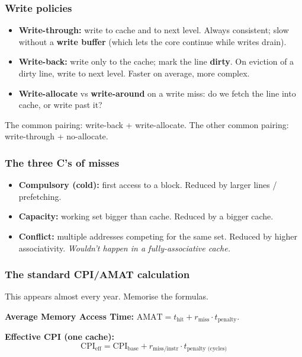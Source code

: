 \documentclass[11pt,a4paper]{article}
\begin{document}
\subsubsection*{Write policies}

\begin{itemize}[leftmargin=*,itemsep=1pt]
  \item \textbf{Write-through:} write to cache and to next level. Always consistent; slow without a \textbf{write buffer} (which lets the core continue while writes drain).
  \item \textbf{Write-back:} write only to the cache; mark the line \textbf{dirty}. On eviction of a dirty line, write to next level. Faster on average, more complex.
  \item \textbf{Write-allocate} vs \textbf{write-around} on a write miss: do we fetch the line into cache, or write past it?
\end{itemize}
The common pairing: write-back + write-allocate. The other common pairing: write-through + no-allocate.

\subsubsection*{The three C's of misses}

\begin{itemize}[leftmargin=*,itemsep=1pt]
  \item \textbf{Compulsory (cold):} first access to a block. Reduced by larger lines / prefetching.
  \item \textbf{Capacity:} working set bigger than cache. Reduced by a bigger cache.
  \item \textbf{Conflict:} multiple addresses competing for the same set. Reduced by higher associativity. \emph{Wouldn't happen in a fully-associative cache.}
\end{itemize}

\subsubsection*{The standard CPI/AMAT calculation}

\begin{must}
This appears almost every year. Memorise the formulas.
\end{must}

\textbf{Average Memory Access Time:} $\text{AMAT} = t_{\text{hit}} + r_{\text{miss}} \cdot t_{\text{penalty}}$.

\textbf{Effective CPI (one cache):}
$$\text{CPI}_{\text{eff}} = \text{CPI}_{\text{base}} + r_{\text{miss/instr}} \cdot t_{\text{penalty (cycles)}}$$
\end{document}
